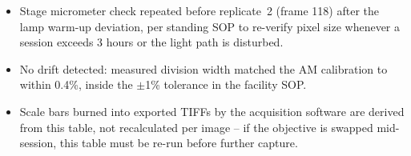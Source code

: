 \begin{tcolorbox}[infobox,title=\faCheckCircle\ Calibration Disposition]
\begin{itemize}
\item Stage micrometer check repeated before replicate~2 (frame 118) after the
      lamp warm-up deviation, per standing SOP to re-verify pixel size whenever
      a session exceeds 3 hours or the light path is disturbed.
\item No drift detected: measured division width matched the AM calibration
      to within 0.4\%, inside the $\pm$1\% tolerance in the facility SOP.
\item Scale bars burned into exported TIFFs by the acquisition software are
      derived from this table, not recalculated per image -- if the objective
      is swapped mid-session, this table must be re-run before further capture.
\end{itemize}
\end{tcolorbox}
